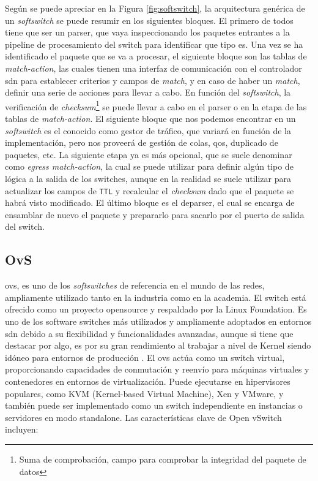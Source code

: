 Según se puede apreciar en la Figura \ref{fig:softswitch}, la arquitectura genérica de un \textit{softswitch} se puede resumir en los siguientes bloques. El primero de todos tiene que ser un parser, que vaya inspeccionando los paquetes entrantes a la pipeline de procesamiento del switch para identificar que tipo es. Una vez se ha identificado el paquete que se va a procesar, el siguiente bloque son las tablas de \textit{match-action}, las cuales tienen una interfaz de comunicación con el controlador \gls{sdn} para establecer criterios y campos de \textit{match}, y en caso de haber un \textit{match}, definir una serie de acciones para llevar a cabo. En función del \textit{softswitch}, la verificación de \textit{checksum}\footnote{Suma de comprobación, campo para comprobar la integridad del paquete de datos} se puede llevar a cabo en el parser o en la etapa de las tablas de \textit{match-action}. El siguiente bloque que nos podemos encontrar en un \textit{softswitch} es el conocido como gestor de tráfico, que variará en función de la implementación, pero nos proveerá de gestión de colas, \gls{qos}, duplicado de paquetes, etc. La siguiente etapa ya es más opcional, que se suele denominar como \textit{egress match-action}, la cual se puede utilizar para definir algún tipo de lógica a la salida de los switches, aunque en la realidad se suele utilizar para actualizar los campos  de \texttt{TTL} y recalcular el \textit{checksum} dado que el paquete se habrá visto modificado. El último bloque es el deparser, el cual se encarga de ensamblar de nuevo el paquete y prepararlo para sacarlo por el puerto de salida del switch.

\subsection{OvS}
\label{subsec:OVS}

\gls{ovs}, es uno de los \textit{softswitches} de referencia en el mundo de las redes, ampliamente utilizado tanto en la industria como en la academia. El switch está ofrecido como un proyecto opensource y respaldado por la Linux Foundation.  Es uno de los software switches más utilizados y ampliamente adoptados en entornos \gls{sdn} debido a su flexibilidad y funcionalidades avanzadas, aunque si tiene que destacar por algo, es por su gran rendimiento al trabajar a nivel de Kernel siendo idóneo para entornos de producción \cite{ovs1}. El \gls{ovs} actúa como un switch virtual, proporcionando capacidades de conmutación y reenvío para máquinas virtuales y contenedores en entornos de virtualización. Puede ejecutarse en hipervisores populares, como KVM (Kernel-based Virtual Machine), Xen y VMware, y también puede ser implementado como un switch independiente en instancias o servidores en modo standalone. Las características clave de Open vSwitch incluyen:


